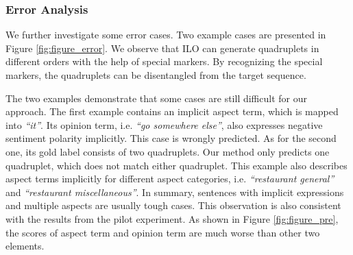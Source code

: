 \documentclass[11pt]{article}
\begin{document}
\begin{table}[]
\small
    \centering
    \caption{Evaluation results of special marker.}
    \label{table:results_marker}
\end{table}

\subsubsection{Error Analysis}
We further investigate some error cases. Two example cases are presented in Figure \ref{fig:figure_error}. We observe that ILO can generate quadruplets in different orders with the help of special markers. By recognizing the special markers, the quadruplets can be disentangled from the target sequence.

The two examples demonstrate that some cases are still difficult for our approach. The first example contains an implicit aspect term, which is mapped into \emph{``it''}. Its opinion term, i.e. \emph{``go somewhere else''}, also expresses negative sentiment polarity implicitly. This case is wrongly predicted. As for the second one, its gold label consists of two quadruplets. Our method only predicts one quadruplet, which does not match either quadruplet. This example also describes aspect terms implicitly for different aspect categories, i.e. \emph{``restaurant general''} and \emph{``restaurant miscellaneous''}. In summary, sentences with implicit expressions and multiple aspects are usually tough cases. This observation is also consistent with the results from the pilot experiment. As shown in Figure \ref{fig:figure_pre}, the  scores of aspect term and opinion term are much worse than other two elements.
\end{document}
